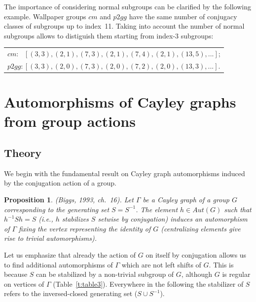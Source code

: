 \documentclass[11pt,a4paper]{article}
\newtheorem{prop}{Proposition} %
\begin{document}
The importance of considering normal subgroups can be clarified by the following example. Wallpaper groups $cm$ and $p2gg$ have the same number of conjugacy classes of subgroups up to index~11. Taking into account the number of normal subgroups allows to distiguish them starting from index-3 subgroups:

\begin{center}
\begin{tabular}{l}
$cm: \, \, \, \, [ (3, 3), (2, 1), (7, 3), (2, 1), (7, 4), (2, 1), (13, 5), ... ]$;\\
$p2gg:  [ (3, 3), (2, 0), (7, 3), (2, 0), (7, 2), (2, 0), (13, 3), ... ]$.
\end{tabular}
\end{center}


\section{Automorphisms of Cayley graphs from group actions} %

\subsection{Theory} \label{auts}

We begin with the fundamental result on Cayley graph automorphisms induced by the conjugation action of a group.

\begin{prop}
\label{prop1}
\emph{(Biggs, 1993, ch.~16)}. Let $\Gamma$ be a Cayley graph of a group $G$ corresponding to the generating set $S=S^{-1}$. The element $h \in Aut(G)$ such that $h^{-1}Sh = S$ (i.e., $h$ stabilizes $S$ setwise by conjugation) induces an automorphism of $\Gamma$ fixing the vertex representing the identity of $G$ (centralizing elements give rise to trivial automorphisms).
\end{prop}

Let us emphasize that already the action of $G$ on itself by conjugation allows us to find additional automorphisms of $\Gamma$ which are not left shifts of $G$. This is because $S$ can be stabilized by a non-trivial subgroup of $G$, although $G$ is regular on vertices of $\Gamma$ (Table~\ref{t:table3}). Everywhere in the following the stabilizer of $S$ refers to the inversed-closed generating set ($S \cup S^{-1}$).
\end{document}
